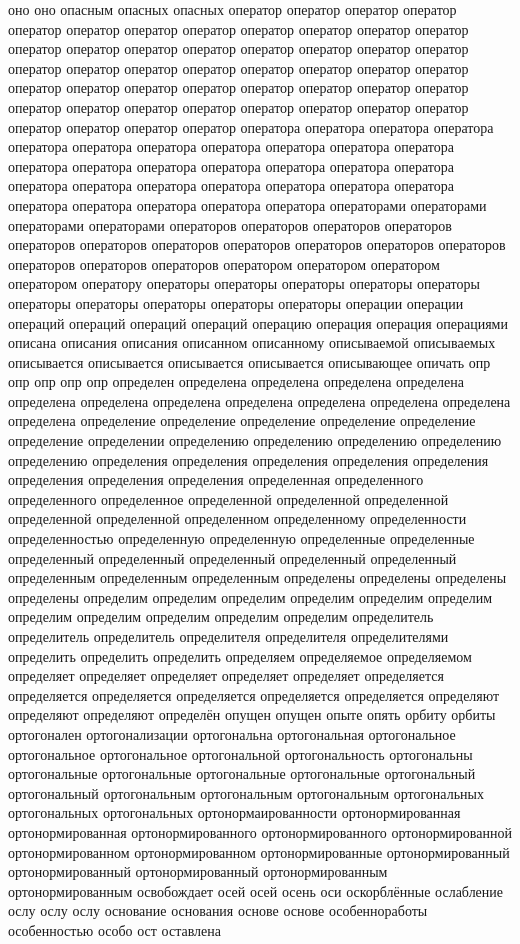 оно оно опасным опасных опасных оператор оператор оператор оператор оператор оператор оператор оператор оператор оператор оператор оператор оператор оператор оператор оператор оператор оператор оператор оператор оператор оператор оператор оператор оператор оператор оператор оператор оператор оператор оператор оператор оператор оператор оператор оператор оператор оператор оператор оператор оператор оператор оператор оператор оператор оператор оператор оператор оператора оператора оператора оператора оператора оператора оператора оператора оператора оператора оператора оператора оператора оператора оператора оператора оператора оператора оператора оператора оператора оператора оператора оператора оператора оператора оператора оператора оператора оператора операторами операторами операторами операторами операторов операторов операторов операторов операторов операторов операторов операторов операторов операторов операторов операторов операторов операторов оператором оператором оператором оператором оператору операторы операторы операторы операторы операторы операторы операторы операторы операторы операторы операции операции операций операций операций операций операцию операция операция операциями описана описания описания описанном описанному описываемой описываемых описывается описывается описывается описывается описывающее опичать опр опр опр опр опр определен определена определена определена определена определена определена определена определена определена определена определена определена определение определение определение определение определение определение определении определению определению определению определению определению определения определения определения определения определения определения определения определения определенная определенного определенного определенное определенной определенной определенной определенной определенной определенном определенному определенности определенностью определенную определенную определенные определенные определенный определенный определенный определенный определенный определенным определенным определенным определены определены определены определены определим определим определим определим определим определим определим определим определим определим определим определитель определитель определитель определителя определителя определителями определить определить определить определяем определяемое определяемом определяет определяет определяет определяет определяет определяется определяется определяется определяется определяется определяется определяют определяют определяют определён опущен опущен опыте опять орбиту орбиты ортогонален ортогонализации ортогональна ортогональная ортогональное ортогональное ортогональное ортогональной ортогональность ортогональны ортогональные ортогональные ортогональные ортогональные ортогональный ортогональный ортогональным ортогональным ортогональным ортогональных ортогональных ортогональных ортонормаированности ортонормированная ортонормированная ортонормированного ортонормированного ортонормированной ортонормированном ортонормированном ортонормированные ортонормированный ортонормированный ортонормированный ортонормированным ортонормированным освобождает осей осей осень оси оскорблённые ослабление ослу ослу ослу основание основания основе основе особенноработы особенностью особо ост оставлена 